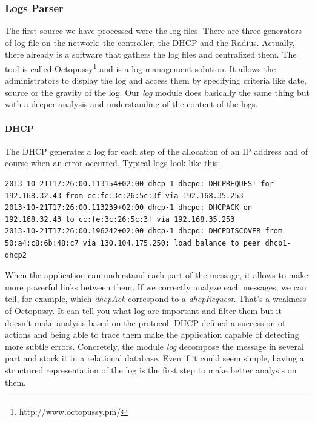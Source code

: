 \subsubsection{Logs Parser}
The first source we have processed were the log files. There are three generators of log file on the network: the controller, the DHCP and the Radius. Actually, there already is a software that gathers the log files and centralized them. The tool is called Octopussy\footnote{http://www.octopussy.pm/} and is a log management solution. It allows the administrators to display the log and access them by specifying criteria like date, source or the gravity of the log. Our \emph{log} module does basically the same thing but with a deeper analysis and understanding of the content of the logs. 
\paragraph{DHCP}
The DHCP generates a log for each step of the allocation of an IP address and of course when an error occurred. Typical logs look like this:
\begin{lstlisting}[frame=single,breaklines=true,caption={DHCP logs}]
2013-10-21T17:26:00.113154+02:00 dhcp-1 dhcpd: DHCPREQUEST for 192.168.32.43 from cc:fe:3c:26:5c:3f via 192.168.35.253
2013-10-21T17:26:00.113239+02:00 dhcp-1 dhcpd: DHCPACK on 192.168.32.43 to cc:fe:3c:26:5c:3f via 192.168.35.253
2013-10-21T17:26:00.196242+02:00 dhcp-1 dhcpd: DHCPDISCOVER from 50:a4:c8:6b:48:c7 via 130.104.175.250: load balance to peer dhcp1-dhcp2
\end{lstlisting}
When the application can understand each part of the message, it allows to make more powerful links between them. If we correctly analyze each messages, we can tell, for example, which \emph{dhcpAck} correspond to a \emph{dhcpRequest}. That's a weakness of Octopussy. It can tell you what log are important and filter them but it doesn't make analysis based on the protocol. DHCP defined a succession of actions and being able to trace them make the application capable of detecting more subtle errors. Concretely, the module \emph{log} decompose the message in several part and stock it in a relational database. Even if it could seem simple, having a structured representation of the log is the first step to make better analysis on them.

